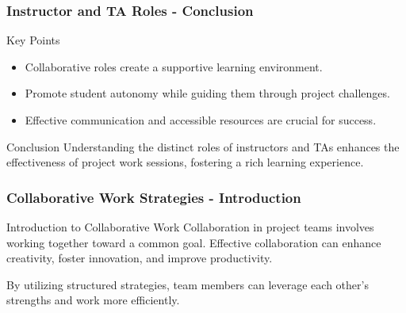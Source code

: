 \documentclass[aspectratio=169]{beamer}
\begin{document}
\begin{frame}[fragile]
    \frametitle{Instructor and TA Roles - Conclusion}
    \begin{block}{Key Points}
        \begin{itemize}
            \item Collaborative roles create a supportive learning environment.
            \item Promote student autonomy while guiding them through project challenges.
            \item Effective communication and accessible resources are crucial for success.
        \end{itemize}
    \end{block}

    \begin{block}{Conclusion}
        Understanding the distinct roles of instructors and TAs enhances the effectiveness of project work sessions, fostering a rich learning experience.
    \end{block}
\end{frame}

\begin{frame}[fragile]
    \frametitle{Collaborative Work Strategies - Introduction}
    \begin{block}{Introduction to Collaborative Work}
        Collaboration in project teams involves working together toward a common goal. 
        Effective collaboration can enhance creativity, foster innovation, and improve productivity.
    \end{block}
    By utilizing structured strategies, team members can leverage each other's strengths and work more efficiently.
\end{frame}
\end{document}
